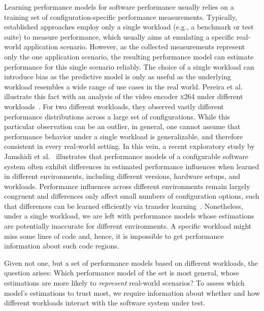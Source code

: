 Learning performance models for software performance usually relies on a training set of configuration-specific performance measurements. 
Typically, established approaches employ only a single workload (e.g., a benchmark or test suite) to measure performance, which usually aims at emulating a specific real-world application scenario. 
However, as the collected measurements represent only the one application scenario, the resulting performance model can  estimate performance for this single scenario reliably. 
The choice of a single workload can introduce bias as the predictive model is only as useful as the underlying workload resembles a wide range of use cases in the real world. 
Pereira et al. illustrate this fact with an analysis of the video encoder \textsc{x264} under different workloads~\cite{alves_sampling_2020}. 
For two different workloads, they observed vastly different performance distributions across a large set of configurations.
While this particular observation can be an outlier, in general, one cannot assume that performance behavior under a single workload is generalizable, and therefore consistent in every real-world setting.
In this vein, a recent exploratory study by Jamshidi et al.~\cite{jamishidi_transfer_2017} illustrates that performance models of a configurable software system often exhibit differences in estimated performance influences when learned in different environments, including different versions, hardware setups, and workloads.
Performance  influences across different environments remain largely congruent and differences only affect small numbers of configuration options, such that differences can be learned efficiently via transfer learning~\cite{jamshidi_transfer_gp_2017,jamshidi_learning_2018}. 
Nonetheless, under a single workload, we are left with performance models whose estimations are potentially inaccurate for different environments. A specific workload might miss some lines of code and, hence, it is impossible to get performance information about such code regions.


Given not one, but a set of performance models based on different workloads, the question arises: Which performance model of the set is most general, whose estimations are more likely to \emph{represent} real-world scenarios? 
To assess which model's estimations to trust most, we require information about whether and how different workloads interact with the software system under test. 

